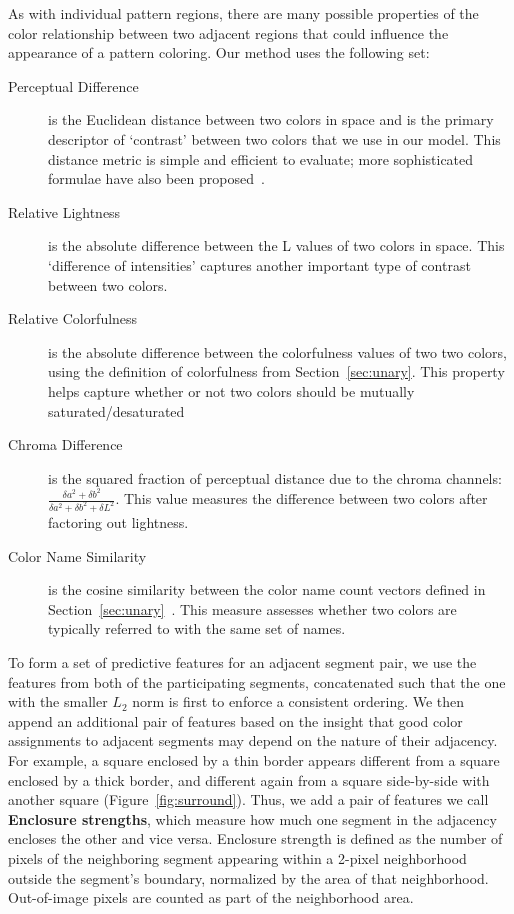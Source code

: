 As with individual pattern regions, there are many possible properties of the color relationship between two adjacent regions that could influence the appearance of a pattern coloring. Our method uses the following set:
\begin{description}
	\item[Perceptual Difference] is the Euclidean distance between two colors in \lab space and is the primary descriptor of `contrast' between two colors that we use in our model. This distance metric is simple and efficient to evaluate; more sophisticated formulae have also been proposed~\cite{CIEDE2000}.
	\item[Relative Lightness] is the absolute difference between the L values of two colors in \lab space. This `difference of intensities' captures another important type of contrast between two colors.
	\item[Relative Colorfulness] is the absolute difference between the colorfulness values of two two colors, using the definition of colorfulness from Section~\ref{sec:unary}. This property helps capture whether or not two colors should be mutually saturated/desaturated
	\item[Chroma Difference] is the squared fraction of perceptual distance due to the \lab chroma channels: $\frac{\delta a^2+\delta b^2}{\delta a^2+\delta b^2+\delta L^2}$. This value measures the difference between two colors after factoring out lightness.
	\item[Color Name Similarity] is the cosine similarity between the color name count vectors defined in Section~\ref{sec:unary}~\cite{ColorNamingModels}. This measure assesses whether two colors are typically referred to with the same set of names.
\end{description}
To form a set of predictive features for an adjacent segment pair, we use the features from both of the participating segments, concatenated such that the one with the smaller $L_2$ norm is first to enforce a consistent ordering. We then append an additional pair of features based on the insight that good color assignments to adjacent segments may depend on the nature of their adjacency. For example, a square enclosed by a thin border appears different from a square enclosed by a thick border, and different again from a square side-by-side with another square (Figure~\ref{fig:surround}). Thus, we add a pair of features we call \textbf{Enclosure strengths}, which measure how much one segment in the adjacency encloses the other and vice versa. Enclosure strength is defined as the number of pixels of the neighboring segment appearing within a 2-pixel neighborhood outside the segment's boundary, normalized by the area of that neighborhood. Out-of-image pixels are counted as part of the neighborhood area.

